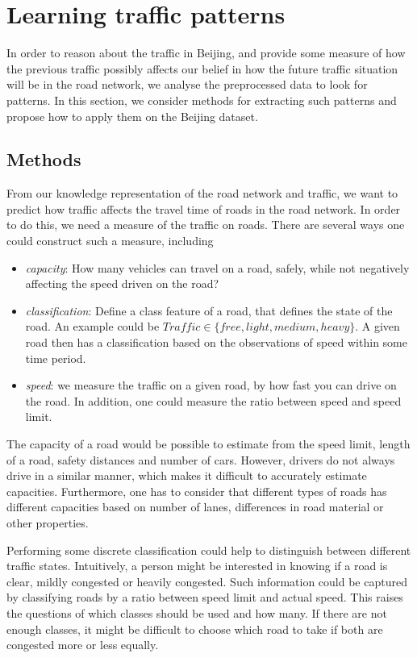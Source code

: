 \section{Learning traffic patterns}\label{traffic-patterns}
In order to reason about the traffic in Beijing, and provide some measure of how the previous traffic possibly affects our belief in how the future traffic situation will be in the road network, we analyse the preprocessed data to look for patterns. In this section, we consider methods for extracting such patterns and propose how to apply them on the Beijing dataset.
\subsection{Methods}\label{patterns:methods}
From our knowledge representation of the road network and traffic, we want to predict how traffic affects the travel time of roads in the road network. In order to do this, we need a measure of the traffic on roads. There are several ways one could construct such a measure, including
\begin{itemize}
\item \emph{capacity}: How many vehicles can travel on a road, safely, while not negatively affecting the speed driven on the road?
\item \emph{classification}: Define a class feature of a road, that defines the state of the road. An example could be $Traffic \in \{free, light, medium, heavy\}$. A given road then has a classification based on the observations of speed within some time period.
\item \emph{speed}: we measure the traffic on a given road, by how fast you can drive on the road. In addition, one could measure the ratio between speed and speed limit.
\end{itemize}
The capacity of a road would be possible to estimate from the speed limit, length of a road, safety distances and number of cars. However, drivers do not always drive in a similar manner, which makes it difficult to accurately estimate capacities. Furthermore, one has to consider that different types of roads has different capacities based on number of lanes, differences in road material or other properties.

Performing some discrete classification could help to distinguish between different traffic states. Intuitively, a person might be interested in knowing if a road is clear, mildly congested or heavily congested. Such information could be captured by classifying roads by a ratio between speed limit and actual speed. This raises the questions of which classes should be used and how many. If there are not enough classes, it might be difficult to choose which road to take if both are congested more or less equally.\par

